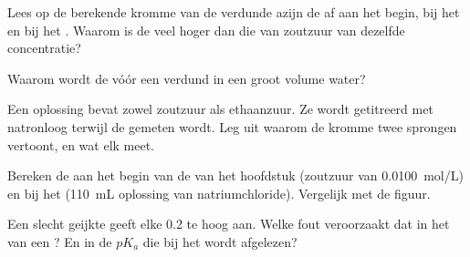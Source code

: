 \begin{exercise}[$\star\star$]\label{exo:g12:ph-conductivity-titrations:10}
Lees op de berekende kromme van de verdunde azijn de  af aan het begin,
bij het  en bij het . Waarom is de
 veel hoger dan die van zoutzuur van dezelfde concentratie?
\end{exercise}

\begin{exercise}[$\star\star$]\label{exo:g12:ph-conductivity-titrations:11}
Waarom wordt de  vóór een 
verdund in een groot volume water?
\end{exercise}

\begin{exercise}[$\star\star\star$]\label{exo:g12:ph-conductivity-titrations:12}
Een oplossing bevat zowel zoutzuur als ethaanzuur. Ze wordt getitreerd met
natronloog terwijl de  gemeten wordt. Leg uit waarom de kromme twee
sprongen vertoont, en wat elk  meet.
\end{exercise}

\begin{exercise}[$\star\star\star$]\label{exo:g12:ph-conductivity-titrations:13}
Bereken de  aan het begin van de 
van het hoofdstuk (zoutzuur van \qty{0.0100}{mol/L}) en bij het
 (\qty{110}{mL} oplossing van natriumchloride).
Vergelijk met de figuur.
\end{exercise}

\begin{exercise}[$\star\star\star$]\label{exo:g12:ph-conductivity-titrations:14}
Een slecht geijkte  geeft elke  0.2 te hoog aan. Welke fout
veroorzaakt dat in het  van een ?
En in de $pK_a$ die bij het  wordt afgelezen?
\end{exercise}

